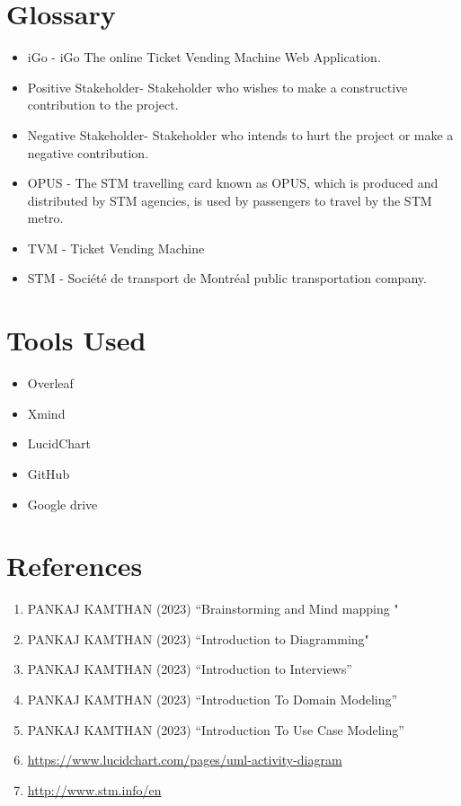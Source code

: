 \documentclass[a4paper, 11pt]{report}
\begin{document}
\chapter{Glossary}
 \begin{itemize}
\item iGo - iGo	The online Ticket Vending Machine Web Application.
\item Positive Stakeholder- Stakeholder who wishes to make a constructive contribution to the project.
\item Negative Stakeholder- Stakeholder who intends to hurt the project or make a negative contribution.
\item OPUS - The STM travelling card known as OPUS, which is produced and distributed by STM agencies, is used by passengers to travel by the STM metro.
\item TVM - Ticket Vending Machine
\item STM - Société de transport de Montréal public transportation company.
\end{itemize}
\chapter{Tools Used}
 \begin{itemize}
     \item Overleaf
     \item Xmind
     \item LucidChart
     \item GitHub
     \item Google drive
 \end{itemize}
\chapter{References}
\begin{enumerate}
  \item PANKAJ KAMTHAN (2023) “Brainstorming and Mind mapping "
  \item PANKAJ KAMTHAN (2023) “Introduction to Diagramming"
  \item PANKAJ KAMTHAN (2023) “Introduction to Interviews”
  \item PANKAJ KAMTHAN (2023) “Introduction To Domain Modeling”
  \item PANKAJ KAMTHAN (2023) “Introduction To Use Case Modeling” 
  \item \url{https://www.lucidchart.com/pages/uml-activity-diagram}
  \item \url{http://www.stm.info/en}
\end{enumerate}
\end{document}
